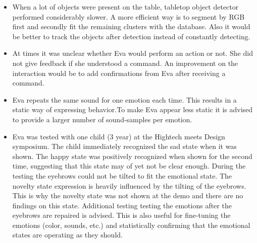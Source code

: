 \documentclass[project_eva.tex]{subfiles}
\begin{document}
\begin{itemize}
\item When a lot of objects were present on the table, tabletop object detector performed considerably slower. A more efficient way is to segment by RGB first and secondly fit the remaining clusters with the database. Also it would be better to track the objects after detection instead of constantly detecting.
\item At times it was unclear whether Eva would perform an action or not. She did not give feedback if she understood a command. An improvement on the interaction would be to add confirmations from Eva after receiving a command.
\item Eva repeats the same sound for one emotion each time. This results in a static way of expressing behavior.To make Eva appear less static it is advised to provide a larger number of sound-samples per emotion.
\item Eva was tested with one child (3 year) at the Hightech meets Design symposium. The child immediately recognized the sad state when it was shown. The happy state was positively recognized when shown for the second time, suggesting that this state may of yet not be clear enough.  During the testing the eyebrows could not be tilted to fit the emotional state. The novelty state expression is heavily influenced by the tilting of the eyebrows. This is why the novelty state was not shown at the demo and there are no findings on this state. Additional testing testing the emotions after the eyebrows are repaired is advised. This is also useful for fine-tuning the emotions (color, sounds, etc.) and statistically confirming that the emotional states are operating as they should.
\end{itemize}
\end{document}
